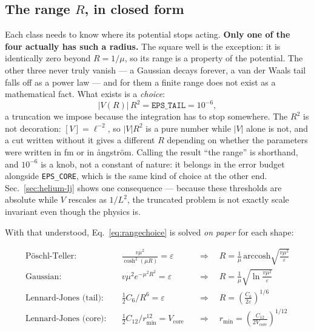 \documentclass[11pt,a4paper]{article}
\begin{document}
\subsection{The range $R$, in closed form}

Each class needs to know where its potential stops acting. \textbf{Only one of
the four actually has such a radius.} The square well is the exception: it is
identically zero beyond $R = 1/\mu$, so its range is a property of the
potential. The other three never truly vanish --- a Gaussian decays forever, a
van der Waals tail falls off as a power law --- and for them a finite range does
not exist as a mathematical fact. What exists is a \emph{choice}:
\begin{equation}
  |V(R)|\,R^2 = \texttt{EPS\_TAIL} = 10^{-6},
  \label{eq:rangechoice}
\end{equation}
a truncation we impose because the integration has to stop somewhere. The
$R^2$ is not decoration: $[V]=\ell^{-2}$, so $|V|R^2$ is a pure number while
$|V|$ alone is not, and a cut written without it gives a different $R$ depending
on whether the parameters were written in fm or in \aa ngstr\"om. Calling the
result ``the range'' is shorthand, and $10^{-6}$ is a knob, not a constant of
nature: it belongs in the error budget alongside \texttt{EPS\_CORE},
which is the same kind of choice at the other end. Sec.~\ref{sec:helium-lj}
shows one consequence --- because these thresholds are absolute while $V$
rescales as $1/L^2$, the truncated problem is not exactly scale invariant even
though the physics is.

With that understood, Eq.~\eqref{eq:rangechoice} is solved \emph{on paper} for
each shape:

\begin{align}
  \text{Pöschl-Teller:}&\quad \frac{v\mu^2}{\cosh^2(\mu R)} = \varepsilon
    &&\Longrightarrow\quad R = \frac{1}{\mu}\,\mathrm{arccosh}\!\sqrt{\frac{v\mu^2}{\varepsilon}}\\
  \text{Gaussian:}&\quad v\mu^2 e^{-\mu^2R^2} = \varepsilon
    &&\Longrightarrow\quad R = \frac{1}{\mu}\sqrt{\ln\frac{v\mu^2}{\varepsilon}}\\
  \text{Lennard-Jones (tail):}&\quad \tfrac12 C_6/R^6 = \varepsilon
    &&\Longrightarrow\quad R = \left(\frac{C_6}{2\varepsilon}\right)^{1/6}\\
  \text{Lennard-Jones (core):}&\quad \tfrac12 C_{12}/r_{\min}^{12} = V_{\text{core}}
    &&\Longrightarrow\quad r_{\min} = \left(\frac{C_{12}}{2V_{\text{core}}}\right)^{1/12}
\end{align}
\end{document}
